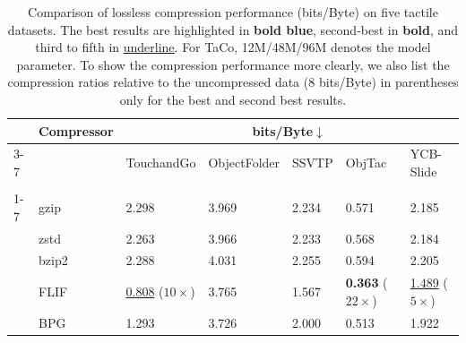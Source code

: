 \usepackage[table]{xcolor}

\begin{table}[tb]
    \belowrulesep=0pt
    \aboverulesep=0pt
    \centering
    \caption{\footnotesize Comparison of lossless compression performance (bits/Byte) on five tactile datasets. The best results are highlighted in \textbf{\color{darkblue}bold blue}, second-best in \textbf{bold}, and third to fifth in \underline{underline}. For TaCo, 12M/48M/96M denotes the model parameter. To show the compression performance more clearly, we also list the compression ratios relative to the uncompressed data (8 bits/Byte) in parentheses only for the best and second best results.}
    \tabsize
    \renewcommand{\arraystretch}{1.1}
    \setlength{\tabcolsep}{6.5pt}
    \newcommand{\centerdash}[1]{\ifx#1-\multicolumn{1}{c}{-}\else#1\fi}
    \vspace{-6pt}
    \begin{tabular}{p{0.24cm}p{4cm}|lllll}
    \toprule
     & \multirow{2}{*}{\textbf{Compressor}}
     & \multicolumn{5}{c}{\textbf{bits/Byte$\downarrow$}}\\[1pt]
     \cmidrule{3-7}
     &
     & TouchandGo
     & ObjectFolder
     & SSVTP
     & ObjTac
     & YCB-Slide\\
    \midrule
    & \cellcolor{lightgray}{uncompressed}
    & \cellcolor{lightgray}{8 ($1\times$)}
    & \cellcolor{lightgray}{8 ($1\times$)}
    & \cellcolor{lightgray}{8 ($1\times$)}
    & \cellcolor{lightgray}{8 ($1\times$)}
    & \cellcolor{lightgray}{8 ($1\times$)}\\
    \cmidrule{1-7}
    \multirow{9.3}{*}{\rotatebox{90}{\textbf{Off-the-Shelf}}}
    & gzip \citep{gzip}   & 2.298 & 3.969 & 2.234 &  0.571 & 2.185\\
    & zstd \citep{zstd}   & 2.263 & 3.966 & 2.233 &  0.568 & 2.184\\
    & bzip2 \citep{bzip2} & 2.288 & 4.031 & 2.255 &  0.594 & 2.205\\
    & FLIF \citep{flif}   & \underline{0.808} ($10\times$) & 3.765 & 1.567 &  \textbf{0.363} ($22\times$) & \underline{1.489} ($5\times$)\\
    & BPG  \citep{bpg}    & 1.293 & 3.726 & 2.000 &  0.513 & 1.922\\

\end{tabular}
\end{table}
